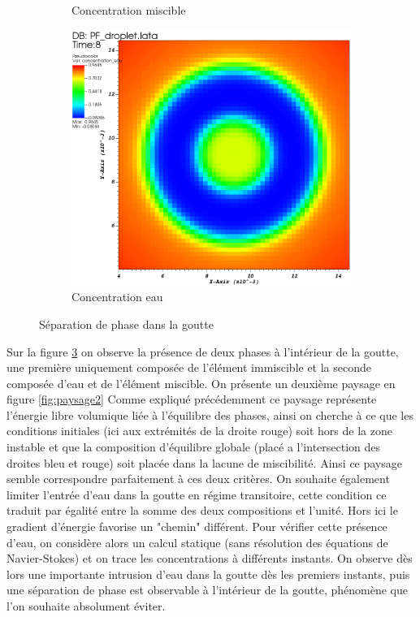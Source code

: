 \begin{figure}[H]
\begin{subfigure}[H]{0.32\textwidth}
 		\caption{Concentration miscible}
 		\label{fig:y equals x}
 	\end{subfigure}
 	\begin{subfigure}[H]{0.32\textwidth}
 		\centering
 		\includegraphics[width=\textwidth]{figure/paysage_base/visit0002.png}
 		\caption{Concentration eau}
 		\label{fig:y equals x}
 	\end{subfigure}
 	\caption{Séparation de phase dans la goutte}
 	\label{land_base_sep}
 \end{figure} \vspace{-0.5cm}
Sur la figure \ref{land_base_sep} on observe la présence de deux phases à l'intérieur de la goutte, une première uniquement composée de l'élément immiscible et la seconde composée d'eau et de l'élément miscible. On présente un deuxième paysage en figure \ref{fig:paysage2}
Comme expliqué précédemment ce paysage représente l'énergie libre volumique liée à l'équilibre des phases, ainsi on cherche à ce que les conditions initiales (ici aux extrémités de la droite rouge) soit hors de la zone instable et que la composition d'équilibre globale (placé a l'intersection des droites bleu et rouge) soit placée dans la lacune de miscibilité. Ainsi ce paysage semble correspondre parfaitement à ces deux critères. On souhaite également limiter l'entrée d'eau dans la goutte en régime transitoire, cette condition ce traduit par égalité entre la somme des deux compositions et l'unité. Hors ici le gradient d'énergie favorise un "chemin" différent. Pour vérifier cette présence d'eau, on considère alors un calcul statique (sans résolution des équations de Navier-Stokes) et on trace les concentrations à différents instants. On observe dès lors une importante intrusion d'eau dans la goutte dès les premiers instants, puis une séparation de phase est observable à l'intérieur de la goutte, phénomène que l'on souhaite absolument éviter.

